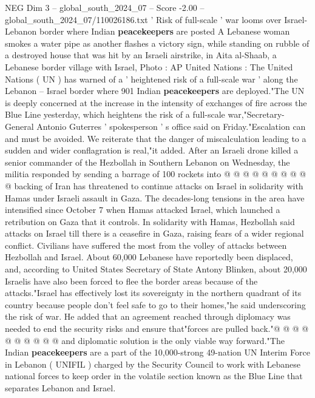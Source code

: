 \begin{textsample}{NEG Dim 3 – global\_south\_2024\_07 – Score -2.00 – global\_south\_2024\_07/110026186.txt}  \label{ex:f3_neg_142}
' Risk of full-scale ' war looms over Israel-Lebanon border where Indian \textbf{peacekeepers} are posted A Lebanese woman smokes a water pipe as another flashes a victory sign, while standing on rubble of a destroyed house that was hit by an Israeli airstrike, in Aita al-Shaab, a Lebanese border village with Israel, Photo : AP United Nations : The United Nations ( UN ) has warned of a ' heightened risk of a full-scale war ' along the Lebanon -- Israel border where 901 Indian \textbf{peacekeepers} are deployed."The UN is deeply concerned at the increase in the intensity of exchanges of fire across the Blue Line yesterday, which heightens the risk of a full-scale war,"Secretary-General Antonio Guterres ' spokesperson ' s office said on Friday."Escalation can and must be avoided.
We reiterate that the danger of miscalculation leading to a sudden and wider conflagration is real,"it added.
After an Israeli drone killed a senior commander of the Hezbollah in Southern Lebanon on Wednesday, the militia responded by sending a barrage of 100 rockets into @ @ @ @ @ @ @ @ @ @ backing of Iran has threatened to continue attacks on Israel in solidarity with Hamas under Israeli assault in Gaza.
The decades-long tensions in the area have intensified since October 7 when Hamas attacked Israel, which launched a retribution on Gaza that it controls.
In solidarity with Hamas, Hezbollah said attacks on Israel till there is a ceasefire in Gaza, raising fears of a wider regional conflict.
Civilians have suffered the most from the volley of attacks between Hezbollah and Israel.
About 60,000 Lebanese have reportedly been displaced, and, according to United States Secretary of State Antony Blinken, about 20,000 Israelis have also been forced to flee the border areas because of the attacks."Israel has effectively lost its sovereignty in the northern quadrant of its country because people don't feel safe to go to their homes,"he said underscoring the risk of war.
He added that an agreement reached through diplomacy was needed to end the security risks and ensure that"forces are pulled back."@ @ @ @ @ @ @ @ @ @ and diplomatic solution is the only viable way forward."The Indian \textbf{peacekeepers} are a part of the 10,000-strong 49-nation UN Interim Force in Lebanon ( UNIFIL ) charged by the Security Council to work with Lebanese national forces to keep order in the volatile section known as the Blue Line that separates Lebanon and Israel.

\end{textsample}
